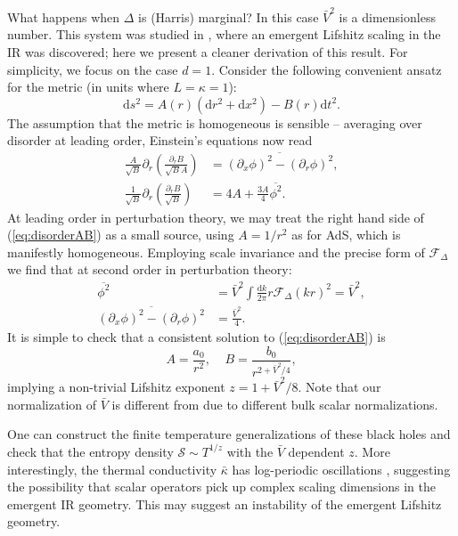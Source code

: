 \documentclass[10pt, oneside]{book}
\begin{document}
\begin{doublespace}
What happens when $\Delta$ is (Harris) marginal?   In this case $\bar V^2$ is a dimensionless number.    This system was studied in \cite{Hartnoll:2014cua}, where an emergent Lifshitz scaling in the IR was discovered;  here we present a cleaner derivation of this result.      For simplicity, we focus on the case $d=1$.  Consider the following convenient ansatz for the metric (in units where $L=\kappa=1$):  \begin{equation}
\mathrm{d}s^2  = A(r) \left( \mathrm{d}r^2 + \mathrm{d}x^2\right) - B(r) \mathrm{d}t^2.
\end{equation}
The assumption that the metric is homogeneous is sensible -- averaging over disorder at leading order, Einstein's equations now read \begin{subequations}\label{eq:disorderAB}\begin{align}
\frac{A}{\sqrt{B}}\partial_r \left(\frac{\partial_r B}{\sqrt{B}A}\right) &= \overline{(\partial_x \phi)^2 - (\partial_r \phi)^2}, \\
\frac{1}{\sqrt{B}}\partial_r \left(\frac{\partial_r B}{\sqrt{B}}\right) &= 4A + \frac{3A}{4} \overline{ \phi^2} .
\end{align}\end{subequations}
At leading order in perturbation theory, we may treat the right hand side of (\ref{eq:disorderAB}) as a small source, using $A=1/r^2$ as for AdS, which is manifestly homogeneous.  Employing scale invariance and the precise form of $\mathcal{F}_\Delta$ we find that at second order in perturbation theory: \begin{subequations}\begin{align}
\overline{\phi^2} &= \bar V^2 \int \frac{\mathrm{d}k}{2\pi} r \mathcal{F}_\Delta(kr)^2 = \bar V^2, \\
\overline{(\partial_x \phi)^2 - (\partial_r \phi)^2} &= \frac{\bar V^2}{4}.
\end{align}\end{subequations}
It is simple to check that a consistent solution to (\ref{eq:disorderAB}) is \begin{equation}
A = \frac{a_0}{r^2}, \;\;\;\; B = \frac{b_0}{r^{2+\bar V^2/4}},
\end{equation}
implying a non-trivial Lifshitz exponent $z=1+\bar V^2/8$.   Note that our normalization of $\bar V$ is different from \cite{Hartnoll:2014cua} due to different bulk scalar normalizations.   

One can construct the finite temperature generalizations of these black holes \cite{Hartnoll:2015faa} and check that the entropy density $\mathcal{S} \sim T^{1/z}$ with the $\bar V$ dependent $z$.   More interestingly,  the thermal conductivity $\bar\kappa$ has log-periodic oscillations \cite{Hartnoll:2015rza}, suggesting the possibility that scalar operators pick up complex scaling dimensions in the emergent IR geometry.   This may suggest an instability of the emergent Lifshitz geometry.


\end{doublespace}
\end{document}
